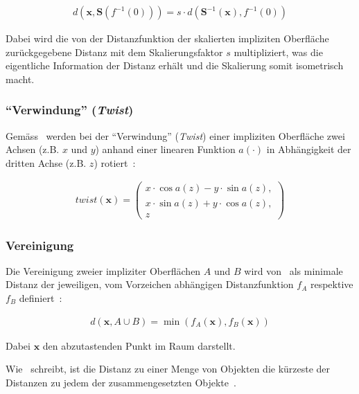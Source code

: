 \begin{gather}
    d(\bm{x}, \bm{S}(f^{-1}(0))) = s \cdot d(\bm{S}^{-1}(\bm{x}), f^{-1}(0))
\end{gather}

Dabei wird die von der Distanzfunktion der skalierten impliziten Oberfläche
zurückgegebene Distanz mit dem Skalierungsfaktor $s$ multipliziert, was die
eigentliche Information der Distanz erhält und die Skalierung somit isometrisch
macht.

\subsubsection{``Verwindung'' (\textit{Twist})}
\label{ssubsec:implicit_surfaces_ops_twist}

Gemäss~\citeauthor{hart_sphere_1994} werden bei der ``Verwindung''
(\textit{Twist}) einer impliziten Oberfläche zwei Achsen (z.B. $x$ und
$y$) anhand einer linearen Funktion $a(\cdot)$ in Abhängigkeit der
dritten Achse (z.B. $z$) rotiert~\parencite[S. 543]{hart_sphere_1994}:

\begin{gather}
    twist(\bm{x}) = \begin{pmatrix} 
        x \cdot \cos{a(z)} - y \cdot \sin{a(z)},\\
        x \cdot \sin{a(z)} + y \cdot \cos{a(z)},\\
        z
    \end{pmatrix}
\end{gather}

\subsubsection{Vereinigung}
\label{ssubsec:implicit_surfaces_ops_union}

Die Vereinigung zweier impliziter Oberflächen $A$ und $B$ wird
von~\citeauthor{hart_sphere_1994} als minimale Distanz der jeweiligen,
vom Vorzeichen abhängigen Distanzfunktion $f_{A}$ respektive $f_{B}$
definiert~\parencite[S. 531 bis 532]{hart_sphere_1994}:

\begin{gather}
    d(\bm{x}, A \cup B) = \min(f_{A}(\bm{x}), f_{B}(\bm{x}))
\end{gather}

Dabei $\bm{x}$ den abzutastenden Punkt im Raum darstellt.

Wie~\citeauthor{hart_sphere_1994} schreibt, ist die Distanz zu einer
Menge von Objekten die kürzeste der Distanzen zu jedem der
zusammengesetzten Objekte~\parencite[S. 531 bis 532]{hart_sphere_1994}.

